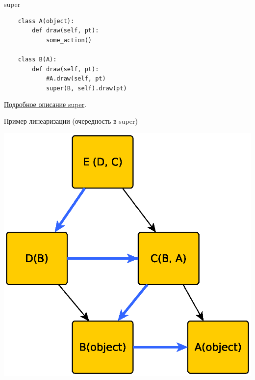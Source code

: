 \documentclass{article}
\begin{document}
\begin{center} super \end{center}
\begin{lstlisting}
    class A(object):
        def draw(self, pt):
            some_action()

    class B(A):
        def draw(self, pt):
            #A.draw(self, pt)
            super(B, self).draw(pt)
\end{lstlisting}
\href{http://www.python.org/download/releases/2.3/mro/}{Подробное описание super}.
\newpage
\begin{center}Пример линеаризации (очередность в super)\end{center}
\includegraphics{images/inheritance_1.eps}
\newpage
\end{document}

